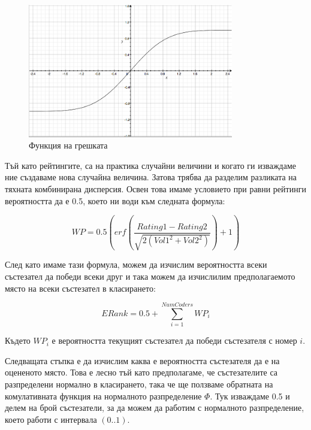 \documentclass[a4paper,12pt]{article}
\begin{document}
  \begin{figure}
    \begin{center}
      \includegraphics[width=0.8\textwidth]{images/error_function.png}
    \end{center}
    \caption{Функция на грешката}
    \label{error_function}
  \end{figure}
  
  Тъй като рейтингите, са на практика случайни величини и когато ги изваждаме ние създаваме нова случайна величина. Затова трябва да разделим разликата на тяхната комбинирана дисперсия. Освен това имаме условието при равни рейтинги вероятността да е 0.5, което ни води към следната формула:
  
  \begin{equation}
    WP=0.5\left(erf\left(\frac{Rating1 - Rating2}{\sqrt{2(Vol1^2+Vol2^2)}}\right) + 1\right)
  \end{equation}
  
  След като имаме тази формула, можем да изчислим вероятността всеки състезател да победи всеки друг и така можем да изчислилим предполагаемото място на всеки състезател в класирането:
  
  \begin{equation}
    ERank=0.5+\sum\limits_{i=1}^{NumCoders} WP_i
  \end{equation}
  
  Където \(WP_i\) е вероятността текущият състезател да победи състезателя с номер \(i\).
  
  Следващата стъпка е да изчислим каква е вероятността състезателя да е на оцененото място. Това е лесно тъй като предполагаме, че състезателите са разпределени нормално в класирането, така че ще ползваме обратната на комулативната функция на нормалното разпределение \(\Phi\). Тук изваждаме 0.5 и делем на брой състезатели, за да можем да работим с нормалното разпределение, което работи с интервала \((0..1)\).
  
\end{document}
